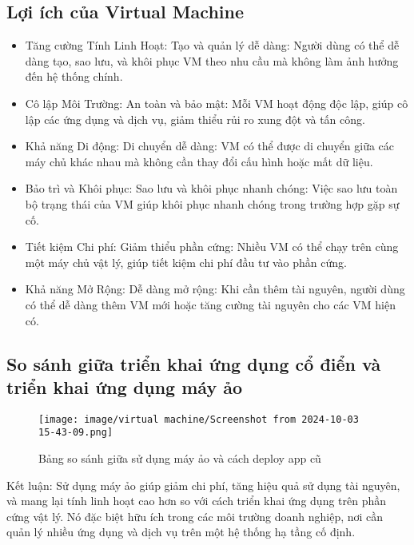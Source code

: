 \documentclass[a4paper,12pt]{article}
\begin{document}
\subsection{ Lợi ích của Virtual Machine}
\begin{itemize}
\item Tăng cường Tính Linh Hoạt:
Tạo và quản lý dễ dàng: Người dùng có thể dễ dàng tạo, sao lưu, và khôi phục VM theo nhu cầu mà không làm ảnh hưởng đến hệ thống chính.
\item Cô lập Môi Trường:
An toàn và bảo mật: Mỗi VM hoạt động độc lập, giúp cô lập các ứng dụng và dịch vụ, giảm thiểu rủi ro xung đột và tấn công.
\item Khả năng Di động:
Di chuyển dễ dàng: VM có thể được di chuyển giữa các máy chủ khác nhau mà không cần thay đổi cấu hình hoặc mất dữ liệu.
\item Bảo trì và Khôi phục:
Sao lưu và khôi phục nhanh chóng: Việc sao lưu toàn bộ trạng thái của VM giúp khôi phục nhanh chóng trong trường hợp gặp sự cố.
\item Tiết kiệm Chi phí:
Giảm thiểu phần cứng: Nhiều VM có thể chạy trên cùng một máy chủ vật lý, giúp tiết kiệm chi phí đầu tư vào phần cứng.
\item Khả năng Mở Rộng:
Dễ dàng mở rộng: Khi cần thêm tài nguyên, người dùng có thể dễ dàng thêm VM mới hoặc tăng cường tài nguyên cho các VM hiện có.
\end{itemize}



\subsection{ So sánh giữa triển khai ứng dụng cổ điển và triển khai ứng dụng máy ảo}

\begin{figure}[h]
    \centering
    \texttt{[image: image/virtual machine/Screenshot from 2024-10-03 15-43-09.png]}
    \caption{Bảng so sánh giữa sử dụng máy ảo và cách deploy app cũ}
    \label{fig:ten_hinh}
\end{figure}




Kết luận:
Sử dụng máy ảo giúp giảm chi phí, tăng hiệu quả sử dụng tài nguyên, và mang lại tính linh hoạt cao hơn so với cách triển khai ứng dụng trên phần cứng vật lý. Nó đặc biệt hữu ích trong các môi trường doanh nghiệp, nơi cần quản lý nhiều ứng dụng và dịch vụ trên một hệ thống hạ tầng cố định.
\end{document}

